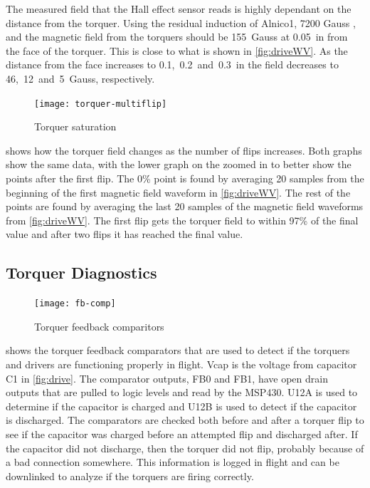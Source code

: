 The measured field that the Hall effect sensor reads is highly dependant on the distance from the torquer. Using the residual induction of Alnico1, 7200 Gauss \cite{AlnicoProp}, and \cite{DexterField} the magnetic field from the torquers should be 155~Gauss at 0.05~in from the face of the torquer. This is close to what is shown in \cref{fig:driveWV}. As the distance from the face increases to 0.1,~0.2~and~0.3~in the field decreases to 46,~12~and~5~Gauss, respectively.

\begin{figure}[H]
    \centering
    \texttt{[image: torquer-multiflip]}
    \caption{Torquer saturation}
    \label{fig:satWV}
\end{figure}

 shows how the torquer field changes as the number of flips increases. Both graphs show the same data, with the lower graph on the zoomed in to better show the points after the first flip. The 0\% point is found by averaging 20 samples from the beginning of the first magnetic field waveform in \cref{fig:driveWV}. The rest of the points are found by averaging the last 20 samples of the magnetic field waveforms from \cref{fig:driveWV}. The first flip gets the torquer field to within 97\% of the final value and after two flips it has reached the final value. 

\subsection{Torquer Diagnostics}

\begin{figure}[H]
    \centering
    \texttt{[image: fb-comp]}
    \caption{Torquer feedback comparitors}
    \label{fig:fb-comp}
\end{figure}

 shows the torquer feedback comparators that are used to detect if the torquers and drivers are functioning properly in flight. Vcap is the voltage from capacitor C1 in \cref{fig:drive}. The comparator outputs, FB0 and FB1, have open drain outputs that are pulled to logic levels and read by the MSP430. U12A  is used to determine if the capacitor is charged and U12B is used to detect if the capacitor is discharged. The comparators are checked both before and after a torquer flip to see if the capacitor was charged before an attempted flip and discharged after. If the capacitor did not discharge, then the torquer did not flip, probably because of a bad connection somewhere. This information is logged in flight and can be downlinked to analyze if the torquers are firing correctly.

